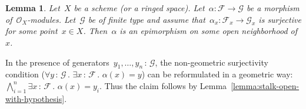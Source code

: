 \documentclass[10pt,reqno,a4paper]{amsbook}
\makeatletter
\theoremstyle{definition}
\theoremstyle{plain}
\newtheorem{lemma}[defn]{Lemma}
\theoremstyle{remark}
\newcommand{\F}{\mathcal{F}}
\renewcommand{\G}{\mathcal{G}}
\renewcommand{\O}{\mathcal{O}}
\newcommand{\?}{\,{:}\,}
\renewcommand{\_}{\mathpunct{.}\,}
\renewenvironment{proof}[1][\proofname]{\par
  \pushQED{\qed}%
  \normalfont \topsep6\p@\@plus6\p@\relax
  \trivlist
  \item[\hskip\labelsep
        \itshape
    #1\@addpunct{.}]\ignorespaces
}{%
  \popQED\endtrivlist\@endpefalse
}
\makeatother
\begin{document}
\begin{lemma}Let~$X$ be a scheme (or a ringed space). Let~$\alpha : \F \to \G$ be
a morphism of~$\O_X$-modules. Let~$\G$ be of finite type and assume
that~$\alpha_x : \F_x \to \G_x$ is surjective for some point~$x \in X$.
Then~$\alpha$ is an epimorphism on some open neighborhood of~$x$.\end{lemma}
\begin{proof}In the presence of generators~$y_1,\ldots,y_n\?\G$, the
non-geometric surjectivity condition ($\forall y\?\G\_ \exists x\?\F\_
\alpha(x) = y$) can be reformulated in a geometric way: $\bigwedge_{i=1}^n
\exists x\?\F\_ \alpha(x) = y_i$. Thus the claim follows by
Lemma~\ref{lemma:stalk-open-with-hypothesis}.\end{proof}

\end{document}
